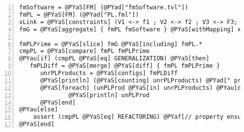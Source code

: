 \documentclass{article}
\begin{document}
\section*{}

\begin{Verbatim}[commandchars=@\[\],numbers=left,firstnumber=1,stepnumber=1]
fmSoftware = @PYaS[FM] (@PYad["fmSoftware.tvl"])
fmPL = @PYaS[FM] (@PYad["PL.fml"])
xLink = @PYaS[constraints] (V1 <-> f1 ; V2 <-> f2 ; V3 <-> F3; )
fmG = @PYaS[aggregate] { fmPL fmSoftware } @PYaS[withMapping] xLink

fmPLPrime = @PYaS[slice] fmG @PYaS[including] fmPL.*
cmpPL = @PYaS[compare] fmPL fmPLPrime
@PYau[if] (cmpPL @PYaS[eq] GENERALIZATION) @PYaS[then]
   fmPLDiff = @PYaS[merge] @PYaS[diff] { fmPL fmPLPrime }
      unrPLProducts = @PYaS[configs] fmPLDiff
      @PYaS[println] (@PYaS[counting] unrPLProducts) @PYad[" products cannot be realized: "] 
      @PYaS[foreach] (unPLProd @PYaS[in] unrPLProducts) @PYau[do]
      	      @PYaS[println] unPLProd
      @PYaS[end]
@PYau[else]
	assert (cmpPL @PYaS[eq] REFACTORING) @PYaf[// property ensured by construction]
@PYaS[end]
\end{Verbatim}
\end{document}
